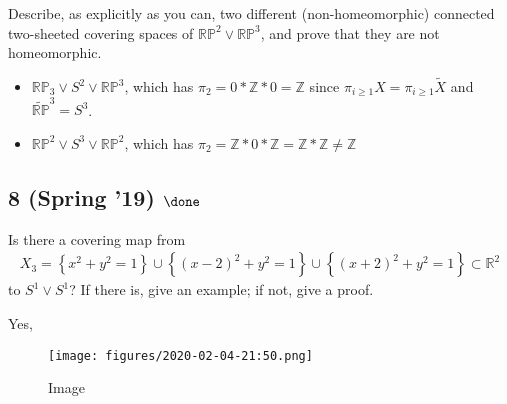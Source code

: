 Describe, as explicitly as you can, two different (non-homeomorphic)
connected two-sheeted covering spaces of
\({\mathbb{RP}}^2 \lor {\mathbb{RP}}^3\), and prove that they are not
homeomorphic.


\begin{solution}

\hfill

\begin{concept}

\hfill

\end{concept}

\begin{itemize}
\tightlist
\item
  \({\mathbb{RP}}_3 \vee S^2 \vee {\mathbb{RP}}^3\), which has
  \(\pi_2 = 0 \ast {\mathbb{Z}}\ast 0 = {\mathbb{Z}}\) since
  \(\pi_{i\geq 1} X = \pi_{i\geq 1}\tilde X\) and
  \(\tilde {\mathbb{RP}}^3 = S^3\).
\item
  \({\mathbb{RP}}^2 \vee S^3 \vee {\mathbb{RP}}^2\), which has
  \(\pi_2 = {\mathbb{Z}}\ast 0 \ast {\mathbb{Z}}= {\mathbb{Z}}\ast {\mathbb{Z}}\neq {\mathbb{Z}}\)
\end{itemize}

\end{solution}

\hypertarget{spring-19-done}{%
\subsection{\texorpdfstring{8 (Spring '19)
\(\done\)}{8 (Spring '19) \textbackslash done}}\label{spring-19-done}}

Is there a covering map from
\begin{align*}
X_3 = \left\{{x^2 + y^2 = 1}\right\} \cup \left\{{(x - 2)^2 + y^2 = 1}\right\} \cup \left\{{(x + 2)^2 + y^2 = 1}\right\} \subset {\mathbb{R}}^2
\end{align*}
to \(S^1 \vee S^1\)? If there is, give an example; if not, give a proof.

\begin{solution}

\hfill

\begin{concept}

\hfill

\end{concept}

Yes,

\begin{figure}
\centering
\texttt{[image: figures/2020-02-04-21:50.png]}
\caption{Image}
\end{figure}

\end{solution}


